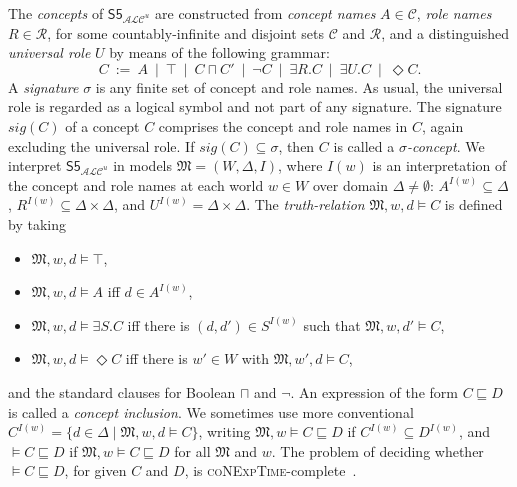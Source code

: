 \documentclass[10pt,a4paper]{amsart}
\theoremstyle{plain}
\theoremstyle{definition}
\newcommand{\sig}{\mathit{sig}}
\newcommand{\ALCIOS}{\ensuremath{\mathsf{S5}_{\mathcal{ALC}^u}}}
\begin{document}
The \emph{concepts} of $\ALCIOS$ are constructed from \emph{concept names} $A \in \mathcal{C}$, \emph{role names} $R \in \mathcal{R}$, 
for some countably-infinite and disjoint sets $\mathcal{C}$ and $\mathcal{R}$, 
and a distinguished \emph{universal role} $U$ by means of the following grammar: 
%
\[
C  ~:=~  A \ \mid  \ \top \ \mid \ C \sqcap C'  \ \mid \ \neg C \ \mid \ \exists R.C \ \mid \ \exists U.C \ \mid \ \Diamond C.
\]
%
A \emph{signature} $\sigma$ is any finite set of concept and role names. As usual, the universal role is regarded as a logical symbol and not part of any signature. The signature $\sig(C)$ of a concept $C$ comprises the concept and role names in $C$, again excluding the universal role. If $\sig(C)\subseteq \sigma$, then $C$ is called a \emph{$\sigma$-concept}.
%
We interpret $\ALCIOS$ in models $\mathfrak{M} = (W,\Delta,I)$, where $I(w)$ is an interpretation of the concept and role names at each world $w\in W$ over domain $\Delta \ne\emptyset$: $A^{I(w)}\subseteq \Delta$, $R^{I(w)} \subseteq \Delta \times \Delta$, and $U^{I(w)} = \Delta \times \Delta$. 
%
The \emph{truth-relation} $\mathfrak{M},w,d\models C$ is defined by taking
%
\begin{itemize}
	\item[--] $\mathfrak M, w, d \models \top$, 
	
	\item[--] $\mathfrak M, w, d \models A$ iff $d \in A^{I(w)}$,  
	
	
	\item[--] $\mathfrak M, w, d \models \exists S.C$ iff there is $(d,d') \in S^{I(w)}$ such that $\mathfrak M, w, d' \models C$, 
	
	\item[--] $\mathfrak M, w, d \models \Diamond C$ iff there is $w' \in W$ with $\mathfrak M, w', d \models C$,
\end{itemize}
%
and the standard clauses for Boolean $\sqcap$ and $\neg$. An expression of the form $C \sqsubseteq D$ is called a \emph{concept inclusion}.
%
We sometimes use more conventional  
%
$C^{I(w)} = \{ d\in \Delta \mid \mathfrak{M},w,d\models C\}$,  
%
writing $\mathfrak{M},w\models C \sqsubseteq D$ if $C^{I(w)} \subseteq D^{I(w)}$, and \mbox{$\models C \sqsubseteq D$} if $\mathfrak{M},w\models C \sqsubseteq D$ for all $\mathfrak{M}$ and $w$. The problem of deciding whether $\models C \sqsubseteq D$, for given $C$ and $D$, is \textsc{coNExpTime}-complete~\cite{GabEtAl03}. 
\end{document}

